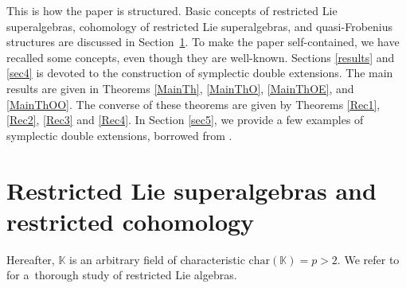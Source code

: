 \documentclass[pdftex]{sigma}
\numberwithin{equation}{section}
\begin{document}
This is how the paper is structured. Basic concepts of restricted Lie superalgebras, cohomology of restricted Lie superalgebras, and quasi-Frobenius structures are discussed in Section~\ref{sec2}. To make the paper self-contained, we have recalled some concepts, even though they are well-known. Sections \ref{results} and \ref{sec4} is devoted to the construction of symplectic double extensions. The main results are given in Theorems \ref{MainTh}, \ref{MainThO}, \ref{MainThOE}, and \ref{MainThOO}. The converse of these theorems are given by Theorems \ref{Rec1}, \ref{Rec2}, \ref{Rec3} and \ref{Rec4}. In Section \ref{sec5}, we provide a few examples of symplectic double extensions, borrowed from \cite{BM, GKN}.

\section{Restricted Lie superalgebras and restricted cohomology}\label{sec2}
Hereafter, $\mathbb{K}$ is an arbitrary field of characteristic $\mathrm{char}(\mathbb{K})=p>2$. We refer to \cite{SF} for a~thorough study of restricted Lie algebras.

\end{document}
